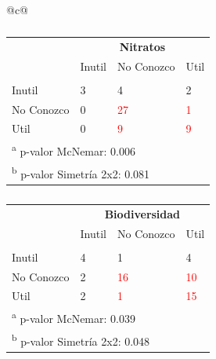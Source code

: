 \documentclass[a4paper, nobind]{templates/ociamthesis}
\begin{document}
\begin{table}[hbtp]
  \begin{threeparttable}
  \caption[Análisis Posthoc de las asociaciones entre PPs]{Tablas de contingencia de cada par de PP que explica la difrencia de percepción entre PPs según el test de McNemar} 
  \label{tab:post-mcnemar}
    \begin{tabular}{@{}c@{}} %
      \begin{minipage}{\textwidth}
        \begin{subtable}[b]{0.4\textwidth}

\begin{tabular}{llll}
\toprule
\multicolumn{1}{c}{\textbf{ }} & \multicolumn{3}{c}{\textbf{Nitratos}} \\
  & Inutil & No Conozco & Util\\
\midrule
\addlinespace[0.3em]
\multicolumn{4}{l}{\textbf{Agua}}\\
\hspace{1em}Inutil & 3 & 4 & 2\\
\hspace{1em}No Conozco & 0 & \textcolor{red}{27} & \textcolor{red}{1}\\
\hspace{1em}Util & 0 & \textcolor{red}{9} & \textcolor{red}{9}\\
\bottomrule
\multicolumn{4}{l}{\textsuperscript{a} p-valor McNemar: 0.006}\\
\multicolumn{4}{l}{\textsuperscript{b} p-valor Simetría 2x2: 0.081}\\
\end{tabular}
        \caption{}
        \label{tab:agua-nitratos}
        \end{subtable}
\hfill
        \begin{subtable}[b]{0.4\textwidth}

\begin{tabular}{llll}
\toprule
\multicolumn{1}{c}{\textbf{ }} & \multicolumn{3}{c}{\textbf{Biodiversidad}} \\
  & Inutil & No Conozco & Util\\
\midrule
\addlinespace[0.3em]
\multicolumn{4}{l}{\textbf{Agua}}\\
\hspace{1em}Inutil & 4 & 1 & 4\\
\hspace{1em}No Conozco & 2 & \textcolor{red}{16} & \textcolor{red}{10}\\
\hspace{1em}Util & 2 & \textcolor{red}{1} & \textcolor{red}{15}\\
\bottomrule
\multicolumn{4}{l}{\textsuperscript{a} p-valor McNemar: 0.039}\\
\multicolumn{4}{l}{\textsuperscript{b} p-valor Simetría 2x2: 0.048}\\
\end{tabular}
        \caption{}
        \label{tab:agua-biodiversidad}
        \end{subtable}
\hfill
        \begin{subtable}[b]{0.4\textwidth}


\end{subtable}
\end{minipage}
\end{tabular}
\end{threeparttable}
\end{table}
\end{document}

